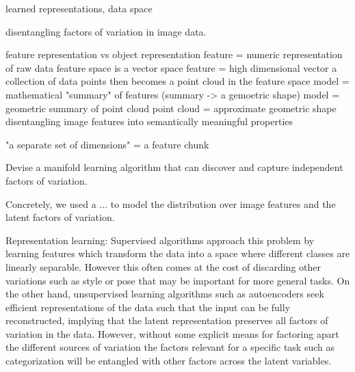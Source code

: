 \documentclass[12pt,a4paper]{article}
\begin{document}
% 

learned representations, data space

disentangling factors of variation in image data. 

feature representation vs object representation
feature = numeric representation of raw data
feature space is a vector space
feature = high dimensional vector
a collection of data points then becomes a point cloud in the feature space 
model = mathematical "summary" of features (summary -> a gemoetric shape)
model = geometric summary of point cloud
point cloud = approximate geometric shape
disentangling image features into semantically meaningful properties

"a separate set of dimensions" = a feature chunk

Devise a manifold learning algorithm that can discover and capture independent factors of variation.

\par Concretely, we used a ... to model the distribution over image features and the latent factors of variation.

Representation learning: Supervised algorithms approach this problem by learning features which transform the data into a space where different classes are linearly separable. However this often comes at the cost of discarding other variations such as style or pose that may be important for more general tasks. On the other hand, unsupervised learning algorithms such as autoencoders seek efficient representations of the data such that the input can be fully reconstructed, implying that the latent representation preserves all factors of variation in the data. However, without some explicit means for factoring apart the different sources of variation the factors relevant for a specific task such as categorization will be entangled with other factors across the latent variables. 
\end{document}
